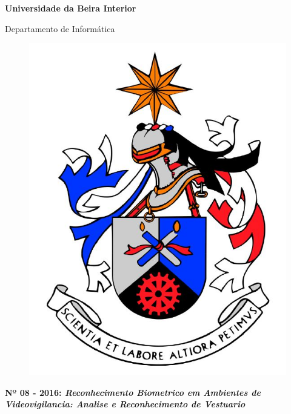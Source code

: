 
\thispagestyle{empty}
\setcounter{page}{-1}

\begin{center}
\begin{Huge}
\textbf{Universidade da Beira Interior}
\end{Huge}
\end{center}

\begin{center}
\begin{Huge}
Departamento de Informática
\end{Huge}
\end{center}

\vspace{0,07cm}
\begin{figure}[!htb]
\centering
\includegraphics[scale=0.3]{brasaoubi.JPG}
\end{figure}

\vspace{0.5cm}
\begin{center}
\begin{Large}
\textbf{Nº 08 - 2016: \emph{Reconhecimento Biometrico em Ambientes de
Videovigilancia: Analise e Reconhecimento de Vestuario}}
\end{Large}
\end{center}


